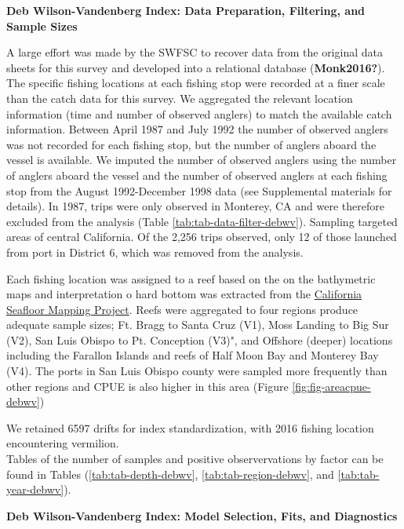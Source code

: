 \documentclass[11pt,
  english,
  a4paper,
]{article}
\begin{document}
\textbf{Deb Wilson-Vandenberg Index: Data Preparation, Filtering, and Sample Sizes}

A large effort was made by the SWFSC to recover data from the original data sheets for this survey and developed into a relational database {(\textbf{Monk2016?})\leavevmode\tagmcend\tagstructend}. The specific fishing locations at each fishing stop were recorded at a finer scale than the catch data for this survey. We aggregated the relevant location information (time and number of observed anglers) to match the available catch information. Between April 1987 and July 1992 the number of observed anglers was not recorded for each fishing stop, but the number of anglers aboard the vessel is available. We imputed the number of observed anglers using the number of anglers aboard the vessel and the number of observed anglers at each fishing stop from the August 1992-December 1998 data (see Supplemental materials for details). In 1987, trips were only observed in Monterey, CA and were therefore excluded from the analysis (Table \ref{tab:tab-data-filter-debwv}). Sampling targeted areas of central California. Of the 2,256 trips observed, only 12 of those launched from port in District 6, which was removed from the analysis.

Each fishing location was assigned to a reef based on the on the bathymetric maps and interpretation o hard bottom was extracted from the {\href{http://seafloor.otterlabs.org/index.html}{California Seafloor Mapping Project}\leavevmode\tagmcend\tagstructend}. Reefs were aggregated to four regions produce adequate sample sizes; Ft. Bragg to Santa Cruz (V1), Moss Landing to Big Sur (V2), San Luis Obispo to Pt. Conception (V3)", and Offshore (deeper) locations including the Farallon Islands and reefs of Half Moon Bay and Monterey Bay (V4). The ports in San Luis Obispo county were sampled more frequently than other regions and CPUE is also higher in this area (Figure \ref{fig:fig-areacpue-debwv})

We retained 6597 drifts for index standardization, with 2016 fishing location encountering vermilion.\\
Tables of the number of samples and positive observervations by factor can be found in Tables (\ref{tab:tab-depth-debwv}, \ref{tab:tab-region-debwv}, and \ref{tab:tab-year-debwv}).

\textbf{Deb Wilson-Vandenberg Index: Model Selection, Fits, and Diagnostics}
\end{document}
